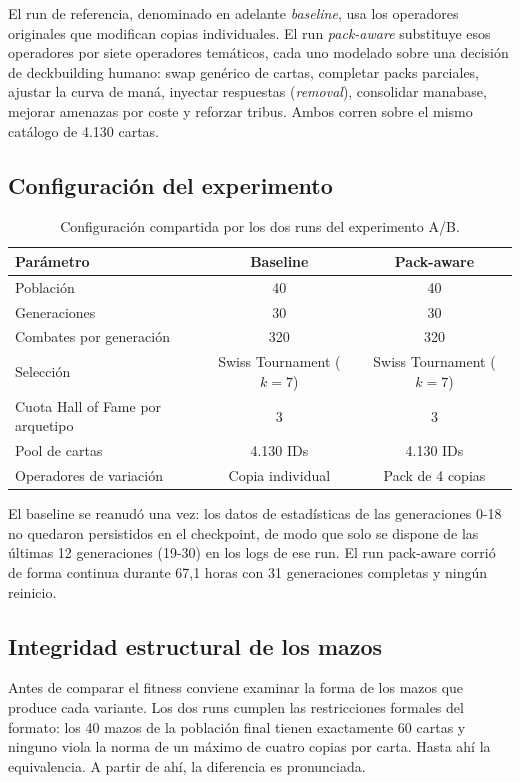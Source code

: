 El run de referencia, denominado en adelante \emph{baseline}, usa los operadores originales que modifican copias individuales. El run \emph{pack-aware} substituye esos operadores por siete operadores temáticos, cada uno modelado sobre una decisión de deckbuilding humano: swap genérico de cartas, completar packs parciales, ajustar la curva de maná, inyectar respuestas (\emph{removal}), consolidar manabase, mejorar amenazas por coste y reforzar tribus. Ambos corren sobre el mismo catálogo de 4.130 cartas.

\subsection{Configuración del experimento}

\begin{table}[H]
\centering
\caption{Configuración compartida por los dos runs del experimento A/B.}
\label{tab:config-ab}
\begin{tabular}{lcc}
\toprule
\textbf{Parámetro} & \textbf{Baseline} & \textbf{Pack-aware} \\
\midrule
Población & 40 & 40 \\
Generaciones & 30 & 30 \\
Combates por generación & 320 & 320 \\
Selección & Swiss Tournament ($k=7$) & Swiss Tournament ($k=7$) \\
Cuota Hall of Fame por arquetipo & 3 & 3 \\
Pool de cartas & 4.130 IDs & 4.130 IDs \\
Operadores de variación & Copia individual & Pack de 4 copias \\
\bottomrule
\end{tabular}
\end{table}

El baseline se reanudó una vez: los datos de estadísticas de las generaciones 0-18 no quedaron persistidos en el checkpoint, de modo que solo se dispone de las últimas 12 generaciones (19-30) en los logs de ese run. El run pack-aware corrió de forma continua durante 67,1 horas con 31 generaciones completas y ningún reinicio.

\subsection{Integridad estructural de los mazos}

Antes de comparar el fitness conviene examinar la forma de los mazos que produce cada variante. Los dos runs cumplen las restricciones formales del formato: los 40 mazos de la población final tienen exactamente 60 cartas y ninguno viola la norma de un máximo de cuatro copias por carta. Hasta ahí la equivalencia. A partir de ahí, la diferencia es pronunciada.

